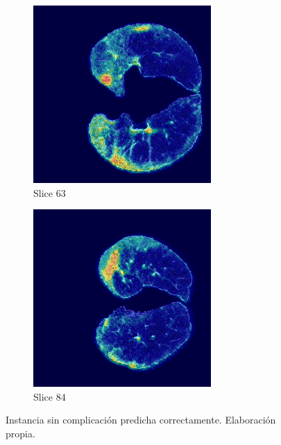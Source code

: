 \begin{figure}[!htbp]
\vspace{0.5cm}

\begin{subfigure}[b]{0.45\textwidth}
    \includegraphics[width=\textwidth]{img/label0_correcto_pred0_pid65HANX_slice_63.png}
    \caption{Slice 63}
\end{subfigure}
\hfill
\begin{subfigure}[b]{0.45\textwidth}
    \includegraphics[width=\textwidth]{img/label0_correcto_pred0_pid65HANX_slice_84.png}
    \caption{Slice 84}
\end{subfigure}

\caption{Instancia sin complicación predicha correctamente. Elaboración propia. }
\label{fig:label0-correcta}
\end{figure}

